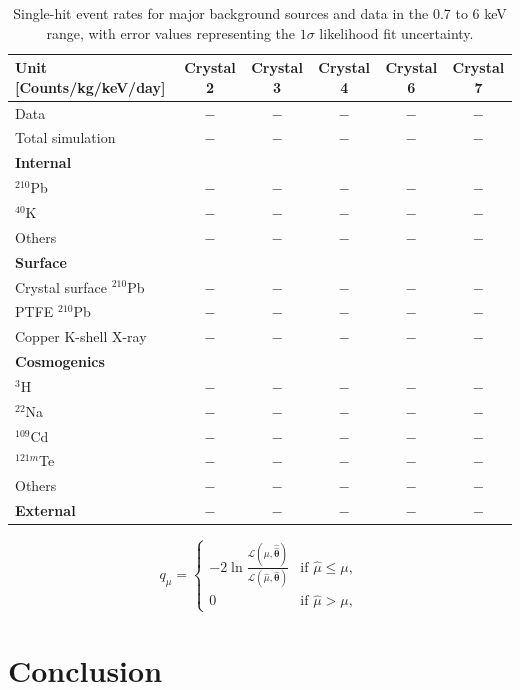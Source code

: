 \documentclass[aps,prd,twocolumn,superscriptaddress,nofootinbib,amsmath,amssymb]{revtex4-2}
\begin{document}
\begin{table}[htbp]
\centering
\caption{Single-hit event rates for major background sources and data in the 0.7 to 6 keV range, with error values representing the $1\sigma$ likelihood fit uncertainty.}
\label{tab:background_rates}
\begin{tabular}{l c c c c c}
\hline\hline
Unit [Counts/kg/keV/day] & Crystal 2 & Crystal 3 & Crystal 4 & Crystal 6 & Crystal 7 \\
\hline
Data & $-$ & $-$ & $-$ & $-$ & $-$ \\
Total simulation & $-$ & $-$ & $-$ & $-$ & $-$ \\
\hline
\textbf{Internal} & & & & & \\
\quad $^{210}$Pb & $-$ & $-$ & $-$ & $-$ & $-$ \\
\quad $^{40}$K & $-$ & $-$ & $-$ & $-$ & $-$ \\
\quad Others & $-$ & $-$ & $-$ & $-$ & $-$ \\
\hline
\textbf{Surface} & & & & & \\
\quad Crystal surface $^{210}$Pb & $-$ & $-$ & $-$ & $-$ & $-$ \\
\quad PTFE $^{210}$Pb & $-$ & $-$ & $-$ & $-$ & $-$ \\
\quad Copper K-shell X-ray & $-$ & $-$ & $-$ & $-$ & $-$ \\
\hline
\textbf{Cosmogenics} & & & & & \\
\quad $^3$H & $-$ & $-$ & $-$ & $-$ & $-$ \\
\quad $^{22}$Na & $-$ & $-$ & $-$ & $-$ & $-$ \\
\quad $^{109}$Cd & $-$ & $-$ & $-$ & $-$ & $-$ \\
\quad $^{121m}$Te & $-$ & $-$ & $-$ & $-$ & $-$ \\
\quad Others & $-$ & $-$ & $-$ & $-$ & $-$ \\
\hline
\textbf{External} & $-$ & $-$ & $-$ & $-$ & $-$ \\
\hline\hline
\end{tabular}
\end{table}


\begin{equation}
    q_\mu = \begin{cases}
        -2 \ln \frac{\mathcal{L}(\mu, \hat{\hat{\bm{\theta}}})}{\mathcal{L}(\hat{\mu}, \hat{\bm{\theta}})} & \text{if } \hat{\mu} \le \mu, \\
        0 & \text{if } \hat{\mu} > \mu,
    \end{cases}
\end{equation}

\section{Conclusion}


\begin{acknowledgments}

\end{acknowledgments}



\end{document}
